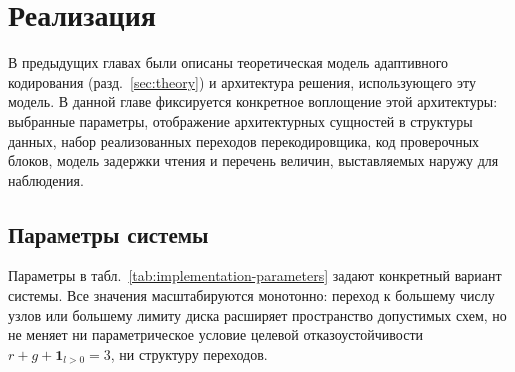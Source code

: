 \section{Реализация}
\label{sec:implementation}

В предыдущих главах были описаны теоретическая модель адаптивного
кодирования (разд.~\ref{sec:theory}) и архитектура решения, использующего эту
модель. В данной главе фиксируется конкретное воплощение этой архитектуры:
выбранные параметры, отображение архитектурных сущностей в структуры данных,
набор реализованных переходов перекодировщика, код проверочных блоков, модель
задержки чтения и перечень величин, выставляемых наружу для наблюдения.

\subsection{Параметры системы}

Параметры в табл.~\ref{tab:implementation-parameters} задают конкретный
вариант системы. Все значения масштабируются монотонно: переход к большему
числу узлов или большему лимиту диска расширяет пространство допустимых схем,
но не меняет ни параметрическое условие целевой отказоустойчивости
$r + g + \mathbf{1}_{l>0} = 3$, ни структуру переходов.


